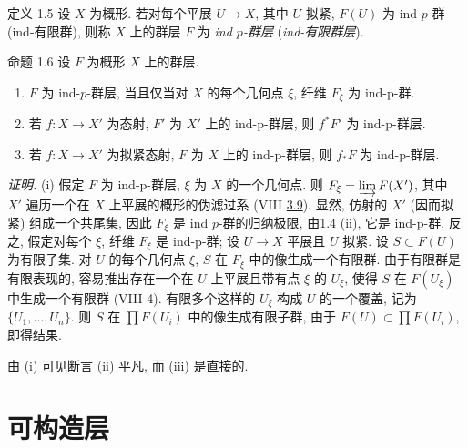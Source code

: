 \begin{enonce*}{定义 1.5}
设 $X$ 为概形. 若对每个平展 $U\rightarrow X$, 其中 $U$ 拟紧,
$F(U)$ 为 ind $p$-群 (\resp ind-有限群),
则称 $X$ 上的群层 $F$ 为 \emph{ind $p$-群层}
(\resp \emph{ind-有限群层}).
\end{enonce*}

\begin{enonce*}{命题 1.6}
设 $F$ 为概形 $X$ 上的群层.
\begin{enumerate}
\renewcommand{\theenumi}{\roman{enumi}}
\renewcommand{\labelenumi}{(\theenumi)}
\item $F$ 为 ind-$p$-群层, 当且仅当对 $X$ 的每个几何点 $\xi$,
纤维 $F_{\xi}$ 为 ind-p-群.

\item 若 $f:X\rightarrow X'$ 为态射,
$F'$ 为 $X'$ 上的 ind-p-群层, 则 $f^{\ast}F'$ 为 ind-p-群层.

\item 若 $f:X\rightarrow X'$ 为拟紧态射,
$F$ 为 $X$ 上的 ind-p-群层, 则 $f_{\ast}F$ 为 ind-p-群层.
\end{enumerate}
\end{enonce*}

\noindent
\emph{证明.}
(i) 假定 $F$ 为 ind-p-群层, $\xi$ 为 $X$ 的一个几何点.
则 $F_{\xi}=\varinjlim F(X')$, 其中 $X'$ 遍历一个在 $X$ 上平展的概形的\pageoriginale 伪滤过系
(VIII \hyperref[VIII.prop3.9]{3.9}).
显然, 仿射的 $X'$ (因而拟紧) 组成一个共尾集,
因此 $F_{\xi}$ 是 ind $p$-群的归纳极限,
由\hyperref[IX.prop1.4]{1.4} (ii), 它是 ind-p-群.
反之, 假定对每个 $\xi$, 纤维 $F_{\xi}$ 是 ind-p-群;
设 $U\rightarrow X$ 平展且 $U$ 拟紧.
设 $S\subset F(U)$ 为有限子集.
对 $U$ 的每个几何点 $\xi$, $S$ 在 $F_{\xi}$ 中的像生成一个有限群.
由于有限群是有限表现的, 容易推出存在一个在 $U$ 上平展且带有点 $\xi$ 的 $U_{\xi}$,
使得 $S$ 在 $F(U_{\xi})$ 中生成一个有限群 (\cf VIII 4).
有限多个这样的 $U_{\xi}$ 构成 $U$ 的一个覆盖, 记为 $\{U_1,\ldots,U_n\}$.
则 $S$ 在 $\prod
F(U_i)$ 中的像生成有限子群,
由于 $F(U)\subset \prod
F(U_i)$, 即得结果.

由 (i) 可见断言 (ii) 平凡, 而 (iii) 是直接的.



\section{可构造层}


